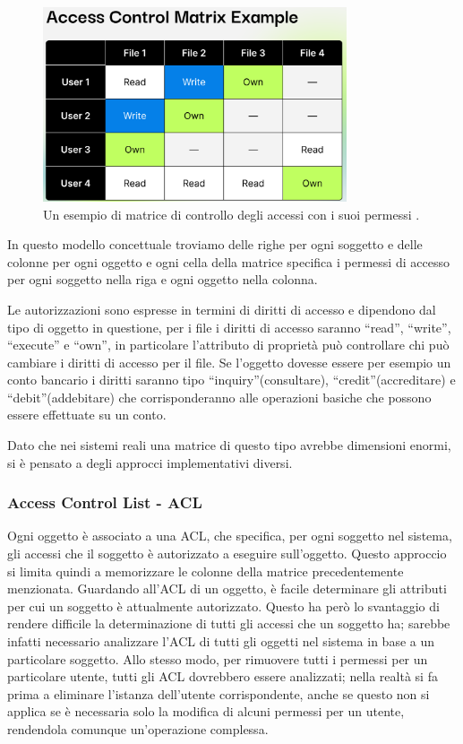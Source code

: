         \begin{figure}[H]
                \centering
                \includegraphics[width=0.8\textwidth]{Immagini/access-control-matrix.png}
                \caption{Un esempio di matrice di controllo degli accessi con i suoi permessi \cite{access_control_matrix_pic}.}
                \label{fig:access_matrix}
            \end{figure}

        In questo modello concettuale troviamo delle righe per ogni soggetto e delle colonne per ogni oggetto e ogni cella della matrice specifica i permessi di accesso per ogni soggetto nella riga e ogni oggetto nella colonna.

        Le autorizzazioni sono espresse in termini di diritti di accesso e dipendono dal tipo di oggetto in questione, per i file i diritti di accesso saranno “read”, “write”, “execute” e “own”, in particolare l'attributo di proprietà può controllare chi può cambiare i diritti di accesso per il file. Se l'oggetto dovesse essere per esempio un conto bancario i diritti saranno tipo “inquiry”(consultare), “credit”(accreditare) e “debit”(addebitare) che corrisponderanno alle operazioni basiche che possono essere effettuate su un conto.

        Dato che nei sistemi reali una matrice di questo tipo avrebbe dimensioni enormi, si è pensato a degli approcci implementativi diversi.

        \subsubsection{Access Control List - ACL}
             Ogni oggetto è associato a una ACL, che specifica, per ogni soggetto nel sistema, gli accessi che il soggetto è autorizzato a eseguire sull'oggetto. Questo approccio si limita quindi a memorizzare le colonne della matrice precedentemente menzionata. Guardando all'ACL di un oggetto, è facile determinare gli attributi per cui un soggetto è attualmente autorizzato. Questo ha però lo svantaggio di rendere difficile la determinazione di tutti gli accessi che un soggetto ha; sarebbe infatti necessario analizzare l'ACL di tutti gli oggetti nel sistema in base a un particolare soggetto. Allo stesso modo, per rimuovere tutti i permessi per un particolare utente, tutti gli ACL dovrebbero essere analizzati; nella realtà si fa prima a eliminare l'istanza dell'utente corrispondente, anche se questo non si applica se è necessaria solo la modifica di alcuni permessi per un utente, rendendola comunque un'operazione complessa.

